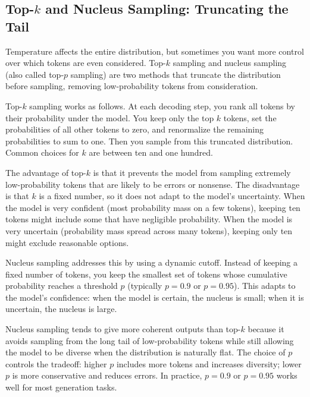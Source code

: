 \subsection{Top-$k$ and Nucleus Sampling: Truncating the Tail}

Temperature affects the entire distribution, but sometimes you want more control over which tokens are even considered. Top-$k$ sampling and nucleus sampling (also called top-$p$ sampling) are two methods that truncate the distribution before sampling, removing low-probability tokens from consideration.

\vspace{0.3cm}

Top-$k$ sampling works as follows. At each decoding step, you rank all tokens by their probability under the model. You keep only the top $k$ tokens, set the probabilities of all other tokens to zero, and renormalize the remaining probabilities to sum to one. Then you sample from this truncated distribution. Common choices for $k$ are between ten and one hundred.

\vspace{0.3cm}

The advantage of top-$k$ is that it prevents the model from sampling extremely low-probability tokens that are likely to be errors or nonsense. The disadvantage is that $k$ is a fixed number, so it does not adapt to the model's uncertainty. When the model is very confident (most probability mass on a few tokens), keeping ten tokens might include some that have negligible probability. When the model is very uncertain (probability mass spread across many tokens), keeping only ten might exclude reasonable options.

\vspace{0.3cm}

Nucleus sampling addresses this by using a dynamic cutoff. Instead of keeping a fixed number of tokens, you keep the smallest set of tokens whose cumulative probability reaches a threshold $p$ (typically $p = 0.9$ or $p = 0.95$). This adapts to the model's confidence: when the model is certain, the nucleus is small; when it is uncertain, the nucleus is large.

\vspace{0.3cm}

Nucleus sampling tends to give more coherent outputs than top-$k$ because it avoids sampling from the long tail of low-probability tokens while still allowing the model to be diverse when the distribution is naturally flat. The choice of $p$ controls the tradeoff: higher $p$ includes more tokens and increases diversity; lower $p$ is more conservative and reduces errors. In practice, $p = 0.9$ or $p = 0.95$ works well for most generation tasks.

